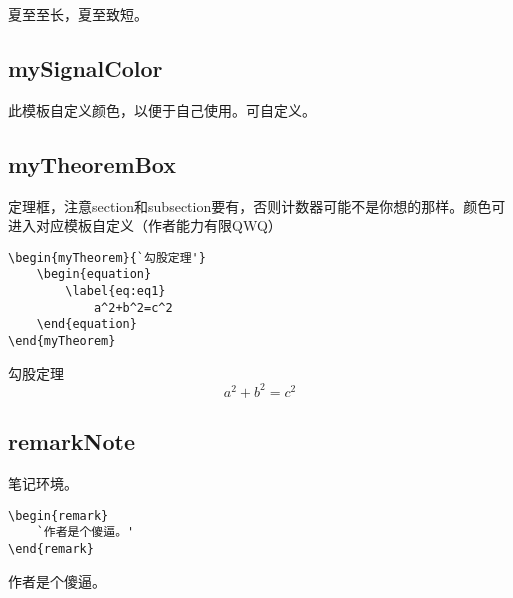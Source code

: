 \documentclass{ctexart}
\begin{document}
    \begin{myReference}
        夏至至长，夏至致短。
    \end{myReference}
    
    \subsection{mySignalColor}
    此模板自定义颜色，以便于自己使用。可自定义。

    \subsection{myTheoremBox}
    
    定理框，注意section和subsection要有，否则计数器可能不是你想的那样。颜色可进入对应模板自定义（作者能力有限QWQ）

    
    \begin{lstlisting}
\begin{myTheorem}{`勾股定理'}
    \begin{equation}
        \label{eq:eq1}
            a^2+b^2=c^2
    \end{equation}
\end{myTheorem}
    \end{lstlisting}
    
    \begin{myTheorem}{勾股定理}
        \begin{equation}
            \label{eq:eq1}
                a^2+b^2=c^2
        \end{equation}
    \end{myTheorem}

    \subsection{remarkNote}
    笔记环境。
    
    \begin{lstlisting}
\begin{remark}
    `作者是个傻逼。'
\end{remark}
    \end{lstlisting}
    
    \begin{remark}
        作者是个傻逼。
    \end{remark}
    
\end{document}
